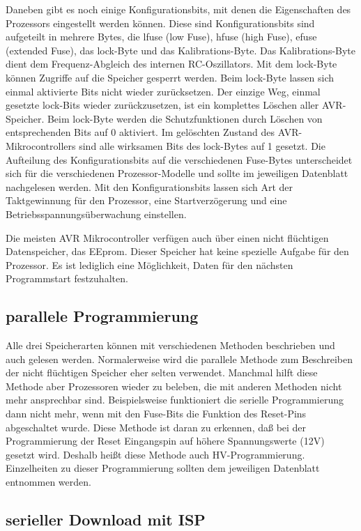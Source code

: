 Daneben gibt es noch einige Konfigurationsbits, mit denen die Eigenschaften
des Prozessors eingestellt werden können.
Diese sind Konfigurationsbits sind aufgeteilt in mehrere Bytes, die lfuse (low Fuse),
hfuse (high Fuse), efuse (extended Fuse), das lock-Byte und das Kalibrations-Byte.
Das Kalibrations-Byte dient dem Frequenz-Abgleich des internen RC-Oszillators.
Mit dem lock-Byte können Zugriffe auf die Speicher gesperrt werden.
Beim lock-Byte lassen sich einmal aktivierte Bits nicht wieder zurücksetzen.
Der einzige Weg, einmal gesetzte lock-Bits wieder zurückzusetzen, ist ein komplettes
Löschen aller AVR-Speicher. Beim lock-Byte werden die Schutzfunktionen durch Löschen 
von entsprechenden Bits auf 0 aktiviert.
Im gelöschten Zustand des AVR-Mikrocontrollers sind alle wirksamen Bits des lock-Bytes auf 1 gesetzt.
Die Aufteilung des Konfigurationsbits auf die verschiedenen Fuse-Bytes unterscheidet
sich für die verschiedenen Prozessor-Modelle und sollte im jeweiligen Datenblatt nachgelesen werden.
Mit den Konfigurationsbits lassen sich Art der Taktgewinnung für den Prozessor, eine
Startverzögerung und eine Betriebsspannungsüberwachung einstellen.


Die meisten AVR Mikrocontroller verfügen auch über einen nicht flüchtigen Datenspeicher,
das EEprom. Dieser Speicher hat keine spezielle Aufgabe für den Prozessor. Es ist lediglich
eine Möglichkeit, Daten für den nächsten Programmstart festzuhalten.

\subsection{parallele Programmierung}
Alle drei Speicherarten können mit verschiedenen Methoden beschrieben und auch gelesen werden.
Normalerweise wird die parallele Methode zum Beschreiben der nicht flüchtigen Speicher eher
selten verwendet. Manchmal hilft diese Methode aber Prozessoren wieder zu beleben,
die mit anderen Methoden nicht mehr ansprechbar sind.
Beispielsweise funktioniert die serielle Programmierung dann nicht mehr, wenn mit den Fuse-Bits
die Funktion des Reset-Pins abgeschaltet wurde.
Diese Methode ist daran zu erkennen,
daß bei der Programmierung der Reset Eingangspin auf höhere Spannungswerte (12V) gesetzt wird.
Deshalb heißt diese Methode auch HV-Programmierung.
Einzelheiten zu dieser Programmierung sollten dem jeweiligen Datenblatt entnommen werden.

\subsection{serieller Download mit ISP}

